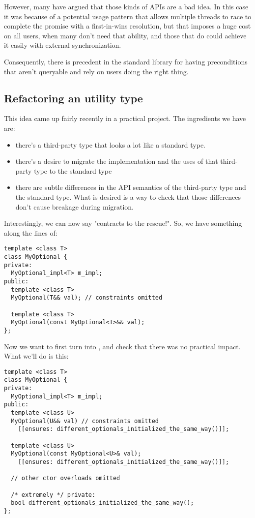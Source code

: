 However, many have argued that those kinds of APIs are a bad idea. In this case
it was because of a potential usage pattern that allows multiple threads to race
to complete the promise with a first-in-wins resolution, but that imposes a huge
cost on all users, when many don’t need that ability, and those that do could
achieve it easily with external synchronization.

Consequently, there is precedent in the standard library for having
preconditions that aren't queryable and rely on users doing the right thing.

\subsection{Refactoring an utility type}

This idea came up fairly recently in a practical project. The ingredients we have are:

\begin{itemize}

\item
there's a third-party type that looks a lot like a standard type.

\item
there's a desire to migrate the implementation and the uses of that third-party type to the standard type

\item
there are subtle differences in the API semantics of the third-party type and the standard type. What is desired is a way to check that those differences don't cause breakage during migration.

\end{itemize}

Interestingly, we can now say "contracts to the rescue!". So, we have something along the lines of:

\begin{lstlisting}
template <class T>
class MyOptional {
private:
  MyOptional_impl<T> m_impl;
public:
  template <class T>
  MyOptional(T&& val); // constraints omitted

  template <class T>
  MyOptional(const MyOptional<T>&& val);
};
\end{lstlisting}

Now we want to first turn  into , and check that
there was no practical impact. What we'll do is this:

\begin{lstlisting}
template <class T>
class MyOptional {
private:
  MyOptional_impl<T> m_impl;
public:
  template <class U>
  MyOptional(U&& val) // constraints omitted
    [[ensures: different_optionals_initialized_the_same_way()]];

  template <class U>
  MyOptional(const MyOptional<U>& val);
    [[ensures: different_optionals_initialized_the_same_way()]];

  // other ctor overloads omitted

  /* extremely */ private:
  bool different_optionals_initialized_the_same_way();
};
\end{lstlisting}

